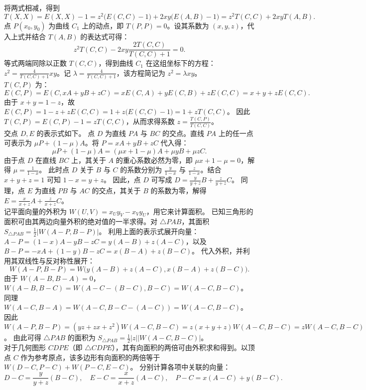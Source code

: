 \begin{solution}
将两式相减，得到
\[ T(X, X) = E(X, X) - 1 = z^2 \big( E(C, C) - 1 \big) + 2xy \big( E(A, B) - 1 \big) = z^2 T(C, C) + 2xy T(A, B). \]
点 $P(x_0, y_0)$ 为曲线 $C_1$ 上的动点，即 $T(P, P) = 0$。设其系数为 $(x, y, z)$，代入上式并结合 $T(A, B)$ 的表达式可得：
\[ z^2 T(C, C) - 2xy \frac{2T(C, C)}{T(C, C)+1} = 0. \]
等式两端同除以正数 $T(C, C)$，得到曲线 $C_1$ 在这组坐标下的方程：$z^2 = \frac{4}{T(C, C)+1} xy$。记 $\lambda = \frac{4}{T(C, C)+1}$，该方程简记为 $z^2 = \lambda xy$。\\
$T(C, P)$ 为：
\[ E(C, P) = E(C, xA + yB + zC) = x E(C, A) + y E(C, B) + z E(C, C) = x + y + z E(C, C). \]
由于 $x + y = 1 - z$，故 $E(C, P) = 1 - z + z E(C, C) = 1 + z \big( E(C, C) - 1 \big) = 1 + z T(C, C)$。
因此 $T(C, P) = E(C, P) - 1 = z T(C, C)$，从而求得系数 $z = \frac{T(C, P)}{T(C, C)}$。\\
交点 $D, E$ 的表示式如下。
点 $D$ 为直线 $PA$ 与 $BC$ 的交点。直线 $PA$ 上的任一点可表示为 $\mu P + (1 - \mu)A$。将 $P = xA + yB + zC$ 代入得：
\[ \mu P + (1 - \mu)A = (\mu x + 1 - \mu)A + \mu y B + \mu z C. \]
由于点 $D$ 在直线 $BC$ 上，其关于 $A$ 的重心系数必然为零，即 $\mu x + 1 - \mu = 0$，解得 $\mu = \frac{1}{1 - x}$。
此时点 $D$ 关于 $B$ 与 $C$ 的系数分别为 $\frac{y}{1 - x}$ 与 $\frac{z}{1 - x}$。结合 $x + y + z = 1$ 可知 $1 - x = y + z$。
因此，点 $D$ 可写成 $D = \frac{y}{y+z}B + \frac{z}{y+z}C$。
同理，点 $E$ 为直线 $PB$ 与 $AC$ 的交点，其关于 $B$ 的系数为零，解得 $E = \frac{x}{x+z}A + \frac{z}{x+z}C$。\\
记平面向量的外积为 $W(U, V) = x_U y_V - x_V y_U$，用它来计算面积。
已知三角形的面积可由其两边向量外积的绝对值的一半求得。对 $\triangle PAB$，其面积 $S_{\triangle PAB} = \frac{1}{2} |W(A - P, B - P)|$。
利用上面的表示式展开向量：$A - P = (1 - x)A - yB - zC = y(A - B) + z(A - C)$，以及 $B - P = -xA + (1 - y)B - zC = x(B - A) + z(B - C)$。
代入外积，并利用其双线性与反对称性展开：
\[ W(A - P, B - P) = W\big(y(A - B) + z(A - C), x(B - A) + z(B - C)\big). \]
由于 $W(A - B, B - A) = 0$，$W(A - B, B - C) = W(A - C - (B - C), B - C) = W(A - C, B - C)$。
同理 $W(A - C, B - A) = W(A - C, B - C - (A - C)) = W(A - C, B - C)$。
因此 $W(A - P, B - P) = (yz + zx + z^2) W(A - C, B - C) = z(x + y + z) W(A - C, B - C) = z W(A - C, B - C)$。
由此可得 $\triangle PAB$ 的面积为 $S_{\triangle PAB} = \frac{1}{2} |z| |W(A - C, B - C)|$。\\
对于几何图形 $CDPE$（即 $\triangle CDPE$），其有向面积的两倍可由外积求和得到。以顶点 $C$ 作为参考原点，该多边形有向面积的两倍等于 $W(D - C, P - C) + W(P - C, E - C)$。
分别计算各项中关联的向量：
\[ D - C = \frac{y}{y+z}(B - C), \quad E - C = \frac{x}{x+z}(A - C), \quad P - C = x(A - C) + y(B - C). \]

\end{solution}
